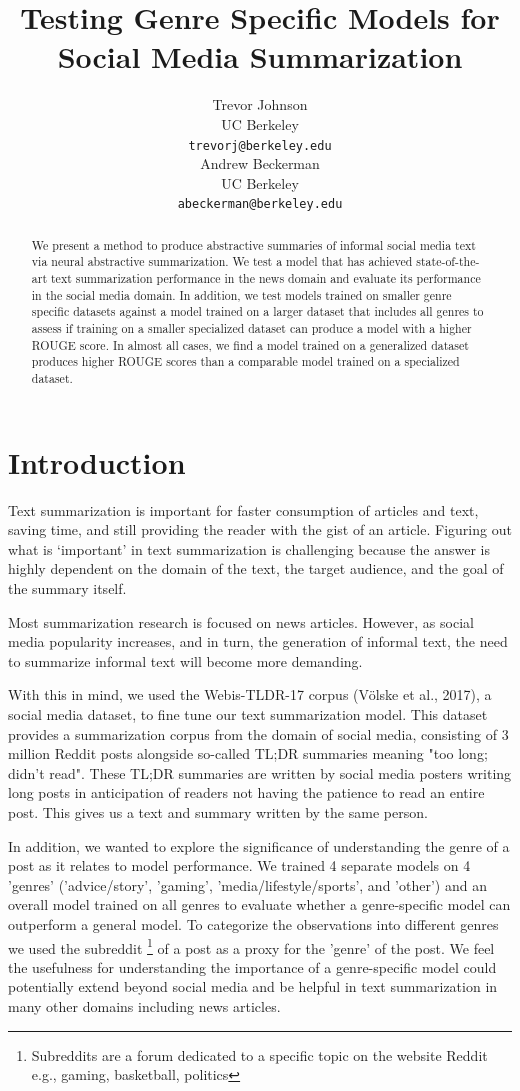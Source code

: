 \documentclass[11pt,a4paper, twocolumn]{article}
\title{Testing Genre Specific Models for Social Media Summarization}
\author{Trevor Johnson \\
  UC Berkeley  \\
  \texttt{trevorj@berkeley.edu} \\\And
  Andrew Beckerman \\
  UC Berkeley \\
  \texttt{abeckerman@berkeley.edu} \\}
\date{}
\begin{document}
\maketitle
\begin{abstract}

We present a method to produce abstractive summaries of informal social media text via neural abstractive summarization. We test a model that has achieved state-of-the-art text summarization performance in the news domain and evaluate its performance in the social media domain.
In addition, we test models trained on smaller genre specific datasets against a model trained on a larger dataset that includes all genres to assess if training on a smaller specialized dataset can produce a model with a higher ROUGE score. In almost all cases, we find a model trained on a generalized dataset produces higher ROUGE scores than a comparable model trained on a specialized dataset. 

\end{abstract}

\section{Introduction}

Text summarization is important for faster consumption of articles and text, saving time, and still providing the reader with the gist of an article. Figuring out what is ‘important’ in text summarization is challenging because the answer is highly dependent on the domain of the text, the target audience, and the goal of the summary itself.

Most summarization research is focused on news articles. However, as social media popularity increases, and in turn, the generation of informal text, the need to summarize informal text will become more demanding.

With this in mind, we used the Webis-TLDR-17 corpus (Völske et al., 2017), a social media dataset, to fine tune our text summarization model. This dataset provides a summarization corpus from the domain of social media, consisting of 3 million Reddit posts alongside so-called TL;DR summaries meaning "too long; didn't read".  These TL;DR summaries are written by social media posters writing long posts in anticipation of readers not having the patience to read an entire post. This gives us a text and summary written by the same person.

In addition, we wanted to explore the significance of understanding the genre of a post as it relates to model performance. We trained 4 separate models on 4 'genres' ('advice/story', 'gaming', 'media/lifestyle/sports', and 'other') and an overall model trained on all genres to evaluate whether a genre-specific model can outperform a general model. To categorize the observations into different genres we used the subreddit \footnote{Subreddits are a forum dedicated to a specific topic on the website Reddit e.g., gaming, basketball, politics} of a post as a proxy for the 'genre' of the post. We feel the usefulness for understanding the importance of a genre-specific model could potentially extend beyond social media and be helpful in text summarization in many other domains including news articles.
\end{document}
